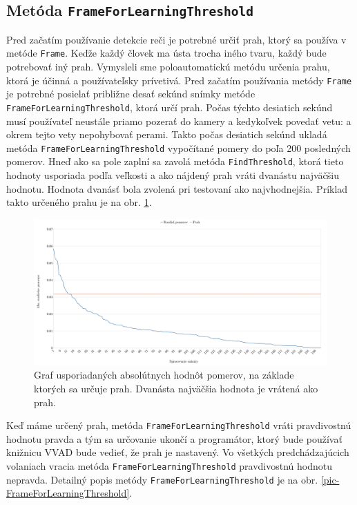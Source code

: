 \subsection{Metóda \texttt{Frame\-For\-Learning\-Threshold}}
Pred začatím používanie detekcie reči je potrebné určiť prah, ktorý sa používa v metóde  \texttt{Frame}. 
Keďže každý človek ma ústa trocha iného tvaru, každý bude potrebovať iný prah.
Vymysleli sme poloautomatickú metódu určenia prahu, ktorá je účinná a používateľsky prívetivá.
Pred začatím používania metódy \texttt{Frame} je potrebné posielať približne desať sekúnd snímky metóde  \texttt{Frame\-For\-Learning\-Threshold}, ktorá určí prah. 
Počas týchto desiatich sekúnd musí používateľ neustále priamo pozerať do kamery a kedykoľvek povedať vetu:  a okrem tejto vety nepohybovať perami.
Takto počas desiatich sekúnd ukladá metóda  \texttt{Frame\-For\-Learning\-Threshold} vypočítané pomery do poľa 200 posledných pomerov.
Hneď ako sa pole zaplní sa zavolá metóda \texttt{FindThreshold}, ktorá tieto hodnoty usporiada podľa veľkosti a ako nájdený prah vráti dvanástu najväčšiu hodnotu.
Hodnota dvanásť bola zvolená pri testovaní ako najvhodnejšia.
Príklad takto určeného prahu je na obr. \ref{pic-kalibraciaUsporiadane}.

\begin{figure}[H]
	\begin{center}
		\includegraphics[width=\textwidth]{pics/kalibraciaUsporiadane.png}
		\caption{Graf usporiadaných absolútnych hodnôt pomerov, na základe ktorých sa určuje prah. Dvanásta najväčšia hodnota je vrátená ako prah.}
		\label{pic-kalibraciaUsporiadane}
	\end{center}
\end{figure}

Keď máme určený prah, metóda \texttt{Frame\-For\-Learning\-Threshold} vráti pravdivostnú hodnotu pravda a tým sa určovanie ukončí a programátor, ktorý bude používať knižnicu VVAD bude vedieť, že prah je nastavený.
Vo všetkých predchádzajúcich volaniach vracia metóda \texttt{Frame\-For\-Learning\-Threshold} pravdivostnú hodnotu nepravda.
Detailný popis metódy \texttt{Frame\-For\-Learning\-Threshold} je na obr. \ref{pic-FrameForLearningThreshold}.

